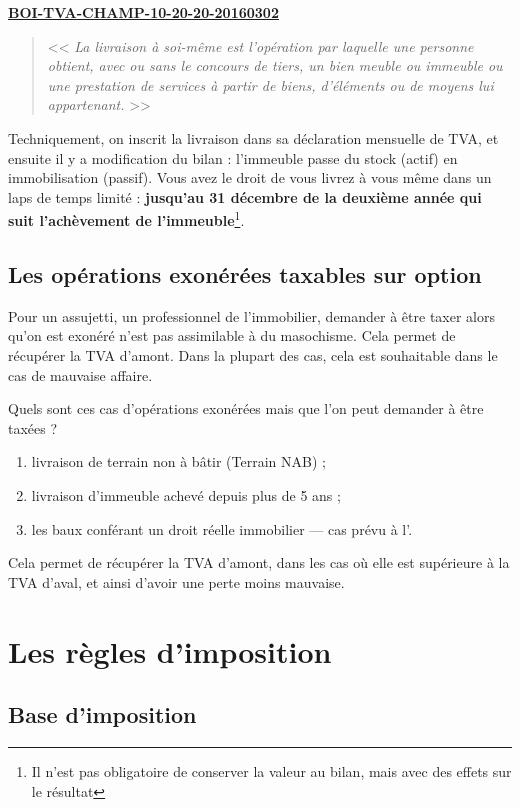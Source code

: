 			 \medskip \href{http://bofip.impots.gouv.fr/bofip/134-PGP.html?identifiant=BOI-TVA-CHAMP-10-20-20-20160302}{\bfseries BOI-TVA-CHAMP-10-20-20-20160302}
			\begin{quote}
				<< {\itshape La livraison à soi-même est l'opération par laquelle une personne obtient, avec ou sans le concours de tiers, un bien meuble ou immeuble ou une prestation de services à partir de biens, d'éléments ou de moyens lui appartenant.} >>
			\end{quote}

			Techniquement, on inscrit la livraison dans sa déclaration mensuelle de TVA, et ensuite il y a modification du bilan : l'immeuble passe du stock (actif) en immobilisation (passif). Vous avez le droit de vous livrez à vous même dans un laps de temps limité : {\bfseries jusqu'au 31 décembre de la deuxième année qui suit l'achèvement de l'immeuble}\footnote{Il n'est pas obligatoire de conserver la valeur au bilan, mais avec des effets sur le résultat}.

	\subsection{Les opérations exonérées taxables sur option}

		Pour un assujetti, un professionnel de l'immobilier, demander à être taxer alors qu'on est exonéré n'est pas assimilable à du masochisme. Cela permet de récupérer la TVA d'amont. Dans la plupart des cas, cela est souhaitable dans le cas de mauvaise affaire.

		\medskip Quels sont ces cas d'opérations exonérées mais que l'on peut demander à être taxées ?
		\begin{enumerate}
			\item livraison de terrain non à bâtir (Terrain NAB) ;
			\item livraison d'immeuble achevé depuis plus de 5 ans ;
			\item les baux conférant un droit réelle immobilier --- cas prévu à l'.
		\end{enumerate}
	Cela permet de récupérer la TVA d'amont, dans les cas où elle est supérieure à la TVA d'aval, et ainsi d'avoir une perte moins mauvaise.

\section{Les règles d’imposition}

	\subsection{Base d’imposition}

